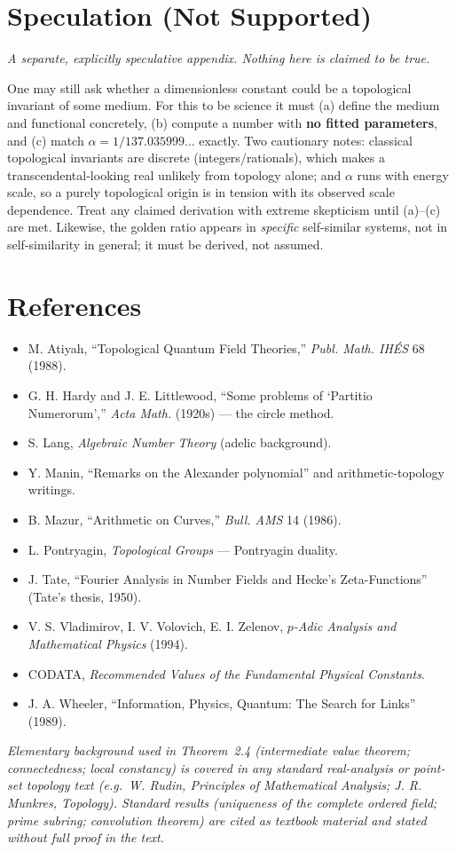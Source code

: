 \documentclass[11pt]{article}
\begin{document}
\appendix
\section{Speculation (Not Supported)}

\emph{A separate, explicitly speculative appendix. Nothing here is claimed to be
true.}

One may still ask whether a dimensionless constant could be a topological
invariant of some medium. For this to be science it must (a) define the medium and
functional concretely, (b) compute a number with \textbf{no fitted parameters},
and (c) match $\alpha = 1/137.035999\ldots$ exactly. Two cautionary notes:
classical topological invariants are discrete (integers/rationals), which makes a
transcendental-looking real unlikely from topology alone; and $\alpha$ runs with
energy scale, so a purely topological origin is in tension with its observed scale
dependence. Treat any claimed derivation with extreme skepticism until (a)--(c)
are met. Likewise, the golden ratio appears in \emph{specific} self-similar
systems, not in self-similarity in general; it must be derived, not assumed.

\section*{References}

\begin{itemize}[leftmargin=1.4em,itemsep=2pt]
\item M. Atiyah, ``Topological Quantum Field Theories,'' \emph{Publ. Math. IH\'ES} 68 (1988).
\item G. H. Hardy and J. E. Littlewood, ``Some problems of `Partitio Numerorum','' \emph{Acta Math.} (1920s) --- the circle method.
\item S. Lang, \emph{Algebraic Number Theory} (adelic background).
\item Y. Manin, ``Remarks on the Alexander polynomial'' and arithmetic-topology writings.
\item B. Mazur, ``Arithmetic on Curves,'' \emph{Bull. AMS} 14 (1986).
\item L. Pontryagin, \emph{Topological Groups} --- Pontryagin duality.
\item J. Tate, ``Fourier Analysis in Number Fields and Hecke's Zeta-Functions'' (Tate's thesis, 1950).
\item V. S. Vladimirov, I. V. Volovich, E. I. Zelenov, \emph{$p$-Adic Analysis and Mathematical Physics} (1994).
\item CODATA, \emph{Recommended Values of the Fundamental Physical Constants}.
\item J. A. Wheeler, ``Information, Physics, Quantum: The Search for Links'' (1989).
\end{itemize}

\noindent\emph{Elementary background used in Theorem~2.4 (intermediate value
theorem; connectedness; local constancy) is covered in any standard real-analysis
or point-set topology text (e.g.\ W. Rudin, Principles of Mathematical Analysis;
J. R. Munkres, Topology). Standard results (uniqueness of the complete ordered
field; prime subring; convolution theorem) are cited as textbook material and
stated without full proof in the text.}
\end{document}
